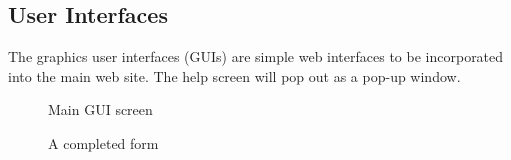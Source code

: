 \subsection{User Interfaces}
The graphics user interfaces (GUIs) are simple web interfaces to be incorporated into the main web site.  The help screen will pop out as a pop-up window.

\setlength\fboxrule{0.5pt}

\begin{figure}[H]

\caption{Main GUI screen}
\end{figure}

\begin{figure}[H]

\caption{A completed form}
\end{figure}


